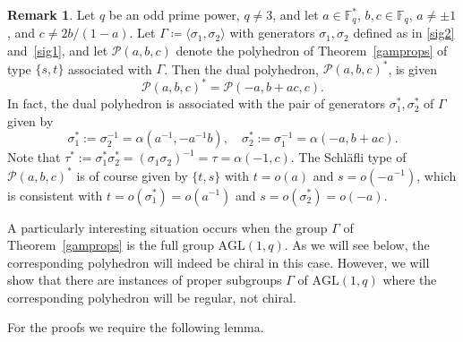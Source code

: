 \documentclass[12pt]{article}
\theoremstyle{definition}\newtheorem{definition}{Definition}[section]
\newtheorem{remark}{Remark}
\begin{document}
\begin{remark}
\label{dual}
Let $q$ be an odd prime power, $q\neq 3$, and let $a\in\mathbb{F}_q^*$, $b,c\in\mathbb{F}_q$, $a\neq \pm 1$, and $c\neq 2b/(1-a)$. Let $\Gamma\coloneqq \langle \sigma_1,\sigma_2\rangle$ with generators $\sigma_1,\sigma_2$ defined as in \eqref{sig2} and~\eqref{sig1}, and let $\mathcal{P}(a,b,c)$ denote the polyhedron of Theorem~\ref{gamprops} of type $\{s,t\}$ associated with $\Gamma$. Then the dual polyhedron, $\mathcal{P}(a,b,c)^*$, is given 
\[\mathcal{P}(a,b,c)^*=\mathcal{P}(-a,b+ac,c).\]
In fact, the dual polyhedron is associated with the pair of generators $\sigma_1^*,\sigma_2^*$ of $\Gamma$ given by
\[\sigma_1^{*}:=\sigma_2^{-1}=\alpha(a^{-1},-a^{-1}b),\quad 
\sigma_2^{*}:=\sigma_1^{-1} =\alpha(-a,b+ac).\]
Note that $\tau^{*}:=\sigma_1^*\sigma_2^*=(\sigma_1\sigma_2)^{-1}=\tau=\alpha(-1,c)$. The Schl\"afli type of 
$\mathcal{P}(a,b,c)^*$ is of course given by $\{t,s\}$ with $t=o(a)$ and $s=o(-a^{-1})$, which is consistent with $t=o(\sigma_1^*)=o(a^{-1})$ and $s=o(\sigma_2^*)=o(-a)$.
\end{remark}
\bigskip

A particularly interesting situation occurs when the group $\Gamma$ of Theorem~\ref{gamprops} is the full group $\mathrm{AGL}(1,q)$. As we will see below, the corresponding polyhedron will indeed be chiral in this case. However, we will show that there are instances of proper subgroups $\Gamma$ of $\mathrm{AGL}(1,q)$ where the corresponding polyhedron will be regular, not chiral.

For the proofs we require the following lemma.
\end{document}
